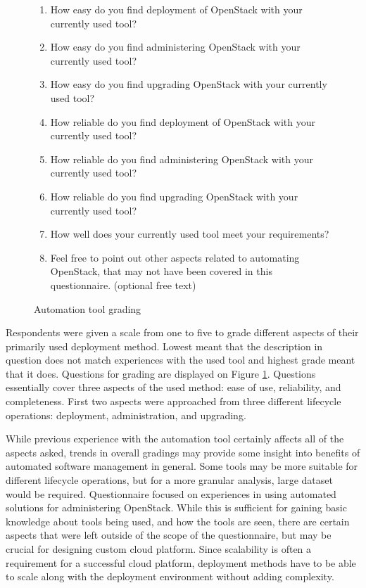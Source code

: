 \begin{figure}[t]
\begin{enumerate}
  \itemsep0em
  \item How easy do you find deployment of OpenStack with your currently used
        tool?
  \item How easy do you find administering OpenStack with your currently used
        tool?
  \item How easy do you find upgrading OpenStack with your currently used tool?
  \item How reliable do you find deployment of OpenStack with your currently
        used tool?
  \item How reliable do you find administering OpenStack with your currently
        used tool?
  \item How reliable do you find upgrading OpenStack with your currently used
        tool?
  \item How well does your currently used tool meet your requirements?
  \item Feel free to point out other aspects related to automating OpenStack,
        that may not have been covered in this questionnaire. (optional free
        text)
\end{enumerate}
\caption{Automation tool grading}
\label{fig:questionnaire-grading}
\end{figure}

Respondents were given a scale from one to five to grade different aspects of
their primarily used deployment method. Lowest meant that the description in
question does not match experiences with the used tool and highest grade meant
that it does. Questions for grading are displayed on Figure
\ref{fig:questionnaire-grading}. Questions essentially cover three aspects of
the used method: ease of use, reliability, and completeness. First two aspects
were approached from three different lifecycle operations: deployment,
administration, and upgrading.

While previous experience with the automation tool certainly affects all of the
aspects asked, trends in overall gradings may provide some insight into
benefits of automated software management in general. Some tools may be more
suitable for different lifecycle operations, but for a more granular analysis,
large dataset would be required. Questionnaire focused on experiences in using
automated solutions for administering OpenStack. While this is sufficient for
gaining basic knowledge about tools being used, and how the tools are seen,
there are certain aspects that were left outside of the scope of the
questionnaire, but may be crucial for designing custom cloud platform. Since
scalability is often a requirement for a successful cloud platform, deployment
methods have to be able to scale along with the deployment environment without
adding complexity.

